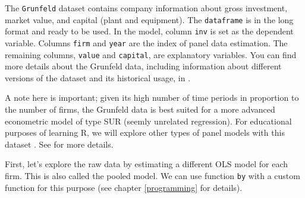 \documentclass[11pt,]{book}
\newenvironment{Shaded}{\begin{snugshade}}{\end{snugshade}}
\newcommand{\KeywordTok}[1]{\textcolor[rgb]{0.27,0.27,0.27}{\textbf{#1}}}
\newcommand{\DataTypeTok}[1]{\textcolor[rgb]{0.27,0.27,0.27}{#1}}
\newcommand{\StringTok}[1]{\textcolor[rgb]{0.5,0.5,0.5}{#1}}
\newcommand{\CommentTok}[1]{\textcolor[rgb]{0.56,0.35,0.01}{\textit{#1}}}
\newcommand{\ControlFlowTok}[1]{\textcolor[rgb]{0.13,0.29,0.53}{\textbf{#1}}}
\newcommand{\OperatorTok}[1]{\textcolor[rgb]{0.81,0.36,0.00}{\textbf{#1}}}
\newcommand{\NormalTok}[1]{#1}
\begin{document}
The \texttt{Grunfeld} dataset contains company information about gross
investment, market value, and capital (plant and equipment). The
\texttt{dataframe} is in the long format and ready to be used. In the
model, column \texttt{inv} is set as the dependent variable. Columns
\texttt{firm} and \texttt{year} are the index of panel data estimation.
The remaining columns, \texttt{value} and \texttt{capital}, are
explanatory variables. You can find more details about the Grunfeld
data, including information about different versions of the dataset and
its historical usage, in \citet{kleiber2010grunfeld}.

A note here is important; given its high number of time periods in
proportion to the number of firms, the Grunfeld data is best suited for
a more advanced econometric model of type SUR (seemly unrelated
regression). For educational purposes of learning R, we will explore
other types of panel models with this dataset . See
\citet{greene2003econometric} for more details.

First, let's explore the raw data by estimating a different OLS model
for each firm. This is also called the pooled model. We can use function
\texttt{by} with a custom function for this purpose (see chapter
\ref{programming} for details).

\begin{Shaded}
\end{Shaded}
\end{document}
